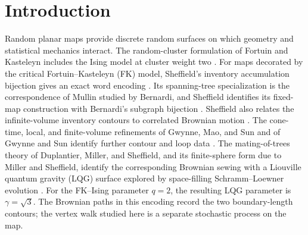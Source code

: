 \begin{abstract}
Using the conformal and metric-measure companion results and the stated
Brownian/Liouville quantum gravity inputs, we prove spectral convergence
for critical spherical FK--Ising maps to Liouville Brownian motion on the
ordinary unit-area $\sqrt3$-quantum sphere. The discrete walk has total
attempt rate one, uses every map edge including loops and multiplicities,
and has the corner measure as its stationary law. Accelerating time by the
number of map edges gives joint convergence of the metric-measure space,
all ordered eigenvalues with multiplicities and padding, and the heat trace
locally uniformly at strictly positive times. The conductivity and clock
constant are one in these conventions.
\end{abstract}

\section{Introduction}\label{sec:introduction}

Random planar maps provide discrete random surfaces on which geometry and
statistical mechanics interact.  The random-cluster formulation of Fortuin
and Kasteleyn includes the Ising model at cluster weight two
\cite{FortuinKasteleyn1972RandomCluster}.  For maps decorated by the critical
Fortuin--Kasteleyn (FK) model, Sheffield's inventory accumulation bijection
gives an exact word encoding \cite{Sheffield2016Inventory}.  Its spanning-tree
specialization is the correspondence of Mullin studied by Bernardi, and
Sheffield identifies its fixed-map construction with Bernardi's subgraph
bijection \cite{Mullin1967TreeRooted,Bernardi2007TreeRooted,Bernardi2008Subgraphs,Sheffield2016Inventory}.
Sheffield also relates the infinite-volume inventory contours to correlated
Brownian motion \cite[Theorem~2.5]{Sheffield2016Inventory}.  The cone-time,
local, and finite-volume refinements of Gwynne, Mao, and Sun and of Gwynne
and Sun identify further contour and loop data
\cite{GwynneMaoSun2019ConeTimes,GwynneSun2017Local,GwynneSun2015Finite}.
The mating-of-trees theory of Duplantier, Miller, and Sheffield, and its
finite-sphere form due to Miller and Sheffield, identify the corresponding
Brownian sewing with a Liouville quantum gravity (LQG) surface explored by
space-filling
Schramm--Loewner evolution
\cite{DuplantierMillerSheffield2021Mating,MillerSheffield2019SphereMating}.
For the FK--Ising parameter \(q=2\), the resulting LQG parameter is
\(\gamma=\sqrt3\).  The Brownian paths in this encoding record the two
boundary-length contours; the vertex walk studied here is a separate
stochastic process on the map.

